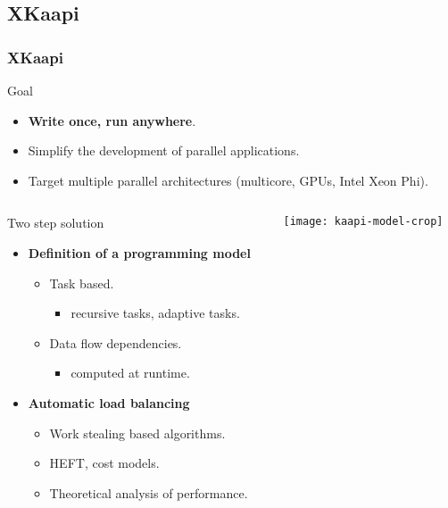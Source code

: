 \subsection{XKaapi}
\begin{frame}
  \frametitle{XKaapi}
  \begin{block}{Goal}
    \begin{itemize}
    \item \textbf{Write once, run anywhere}.
    \item Simplify the development of parallel applications.
    \item Target multiple parallel architectures (multicore, GPUs, Intel Xeon Phi).
    \end{itemize}
  \end{block}
  \vspace*{-2mm}
  \begin{columns}
    \begin{column}{0.6\textwidth}
      \begin{exampleblock}{Two step solution}
      \begin{itemize}
      \item<2-> {\bf Definition of a programming model}
	\begin{itemize}
	\item Task based.
	  \begin{itemize}
	  \item recursive tasks, adaptive tasks.
	  \end{itemize}
	\item Data flow dependencies.
	  \begin{itemize}
	  \item computed at runtime.
	  \end{itemize}
	\end{itemize}
      \item<3-> {\bf Automatic load balancing}
	\begin{itemize}
	\item Work stealing based algorithms.
	\item HEFT, cost models.
	\item Theoretical analysis of performance.
	\end{itemize}
      \end{itemize}
      \end{exampleblock}
    \end{column}
    \begin{column}{0.4\textwidth}
      \begin{center}
	\texttt{[image: kaapi-model-crop]}
      \end{center}
    \end{column}
  \end{columns}
\end{frame}
